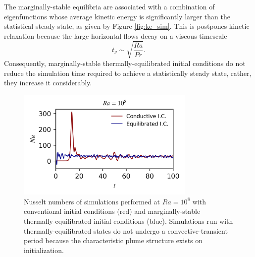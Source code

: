 \documentclass[reprint,amsmath,amssymb,aps]{revtex4-1}
\newcommand\Nu{\mathrm{Nu}}
\begin{document}
The marginally-stable equilibria are associated with a combination of eigenfunctions whose average kinetic energy is significantly larger than the statistical steady state, as given by Figure \ref{fig:ke_sim}. 
This is postpones kinetic relaxation because the large horizontal flows decay on a viscous timescale
\begin{equation}
    t_{\nu} \sim \sqrt{\frac{Ra}{Pr}}. \nonumber
\end{equation}
Consequently, marginally-stable thermally-equilibrated initial conditions do not reduce the simulation time required to achieve a statistically steady state, rather, they increase it considerably.
\begin{figure}
    \begin{minipage}{3.4in}
        \centering
        \includegraphics[width=3.4in]{sim_eq_nu.png}
        \caption{Nusselt numbers of simulations performed at $Ra = 10^8$ with conventional initial conditions (red) and marginally-stable thermally-equilibrated initial conditions (blue). 
        Simulations run with thermally-equilibrated states do not undergo a convective-transient period because the characteristic plume structure exists on initialization.}
        \label{fig:nu_sim}
    \end{minipage}
\end{figure}
\end{document}
